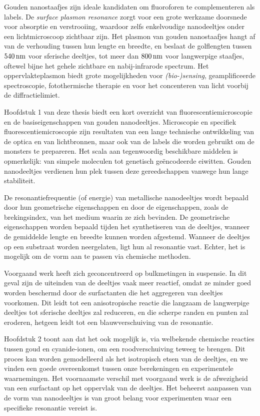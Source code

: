 { Gouden nanostaafjes zijn ideale kandidaten om
fluoroforen te complementeren als labels. De \textit{surface plasmon resonance}
zorgt voor een grote werkzame doorsnede voor absorptie en verstrooiing, waardoor zelfs
enkelvoudige nanodeeltjes onder een lichtmicroscoop zichtbaar zijn. Het plasmon
van gouden nanostaafjes hangt af van de verhouding tussen hun lengte en breedte,
en beslaat de golflengten tussen $540\,\textrm{nm}$ voor sferische deeltjes, tot meer dan
$800\,\textrm{nm}$ voor langwerpige staafjes, oftewel bijne het gehele zichtbare en
nabij-infrarode spectrum. Het oppervlakteplasmon biedt grote mogelijkheden voor
\textit{(bio-)sensing}, geamplificeerde spectroscopie, fotothermische therapie
en voor het concenteren van licht voorbij de diffractielimiet. 

Hoofdstuk 1 van deze thesis biedt een kort overzicht van
fluorescentiemicroscopie en de basiseigenschappen van gouden nanodeeltjes.
Microscopie en specifiek fluorescentiemicroscopie zijn resultaten van een lange
technische ontwikkeling van de optica en van lichtbronnen, maar ook van de
labels die worden gebruikt om de monsters te prepareren. Het scala aan
tegenwoordig beschikbare middelen is opmerkelijk: van simpele moleculen tot
genetisch ge\"{e}ncodeerde eiwitten. Gouden nanodeeltjes verdienen hun plek
tussen deze gereedschappen vanwege hun lange stabiliteit. 

De resonantiefrequentie (of energie) van metallische nanodeeltjes wordt bepaald
door hun geometrische eigenschappen en door de eigenschappen, zoals de
brekingsindex, van het medium waarin ze zich bevinden. De geometrische
eigenschappen worden bepaald tijden het synthetiseren van de deeltjes, wanneer
de gemiddelde lengte en breedte kunnen worden afgestemd. Wanneer de deeltjes op
een substraat worden neergelaten, ligt hun al resonantie vast. Echter, het is
mogelijk om de vorm aan te passen via chemische methoden. 

Voorgaand werk heeft zich geconcentreerd op bulkmetingen in suspensie. In dit
geval zijn de uiteinden van de deeltjes vaak meer reactief, omdat ze minder goed
worden beschermd door de surfactanten die het aggregeren van deeltjes voorkomen.
Dit leidt tot een anisotropische reactie die langzaam de langwerpige deeltjes
tot sferische deeltjes zal reduceren, en die scherpe randen en punten zal
eroderen, hetgeen leidt tot een blauwverschuiving van de resonantie. 

Hoofdstuk 2 toont aan dat het ook mogelijk is, via welbekende chemische reacties
tussen goud en cyanide-ionen, om een roodverschuiving teweeg te brengen. Dit
proces kan worden gemodelleerd als het isotropisch etsen van de deeltjes, en we
vinden een goede overeenkomst tussen onze berekeningen en experimentele
waarnemingen. Het voornaamste verschil met voorgaand werk is de afwezigheid van
een surfactant op het oppervlak van de deeltjes. Het beheerst aanpassen van de
vorm van nanodeeltjes is van groot belang voor experimenten waar een specifieke
resonantie vereist is.

}
